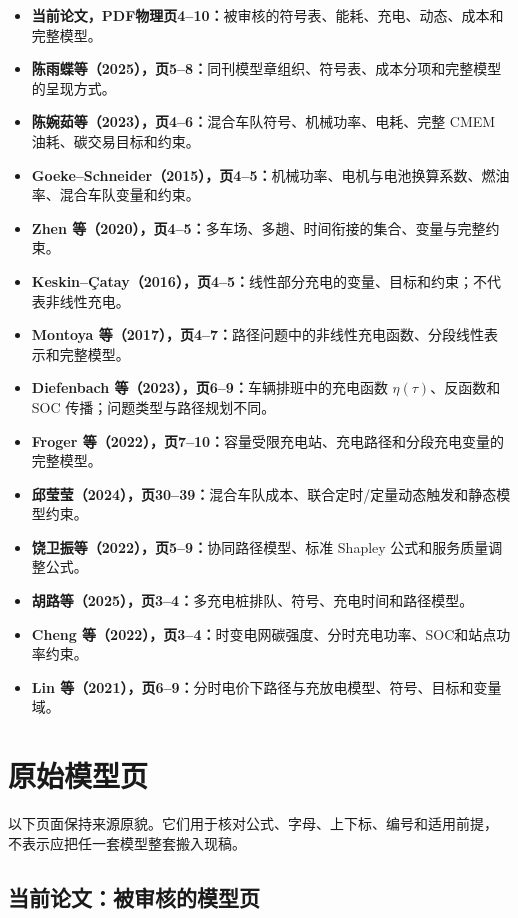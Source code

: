 \documentclass[UTF8,11pt,a4paper,fontset=none]{ctexart}
\begin{document}
\begin{itemize}
  \item \textbf{当前论文，PDF物理页4--10：}被审核的符号表、能耗、充电、动态、成本和完整模型。
  \item \textbf{陈雨蝶等（2025），页5--8：}同刊模型章组织、符号表、成本分项和完整模型的呈现方式。
  \item \textbf{陈婉茹等（2023），页4--6：}混合车队符号、机械功率、电耗、完整 CMEM 油耗、碳交易目标和约束。
  \item \textbf{Goeke--Schneider（2015），页4--5：}机械功率、电机与电池换算系数、燃油率、混合车队变量和约束。
  \item \textbf{Zhen 等（2020），页4--5：}多车场、多趟、时间衔接的集合、变量与完整约束。
  \item \textbf{Keskin--Çatay（2016），页4--5：}线性部分充电的变量、目标和约束；不代表非线性充电。
  \item \textbf{Montoya 等（2017），页4--7：}路径问题中的非线性充电函数、分段线性表示和完整模型。
  \item \textbf{Diefenbach 等（2023），页6--9：}车辆排班中的充电函数 $\eta(\tau)$、反函数和 SOC 传播；问题类型与路径规划不同。
  \item \textbf{Froger 等（2022），页7--10：}容量受限充电站、充电路径和分段充电变量的完整模型。
  \item \textbf{邱莹莹（2024），页30--39：}混合车队成本、联合定时/定量动态触发和静态模型约束。
  \item \textbf{饶卫振等（2022），页5--9：}协同路径模型、标准 Shapley 公式和服务质量调整公式。
  \item \textbf{胡路等（2025），页3--4：}多充电桩排队、符号、充电时间和路径模型。
  \item \textbf{Cheng 等（2022），页3--4：}时变电网碳强度、分时充电功率、SOC和站点功率约束。
  \item \textbf{Lin 等（2021），页6--9：}分时电价下路径与充放电模型、符号、目标和变量域。
\end{itemize}

\section{原始模型页}

以下页面保持来源原貌。它们用于核对公式、字母、上下标、编号和适用前提，
不表示应把任一套模型整套搬入现稿。

\subsection{当前论文：被审核的模型页}

\end{document}
